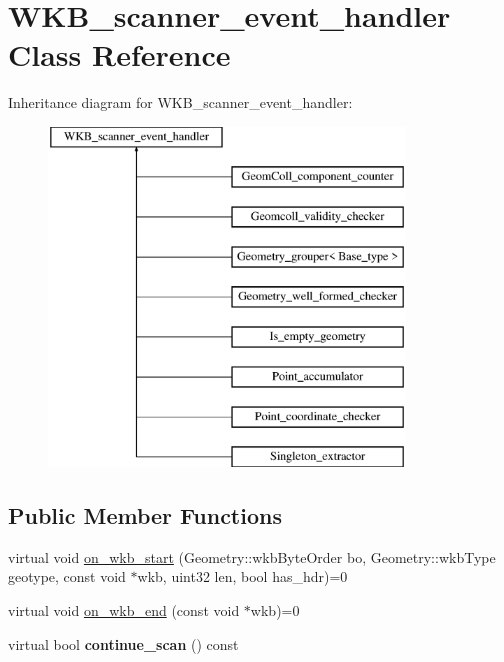 \hypertarget{classWKB__scanner__event__handler}{}\section{W\+K\+B\+\_\+scanner\+\_\+event\+\_\+handler Class Reference}
\label{classWKB__scanner__event__handler}
Inheritance diagram for W\+K\+B\+\_\+scanner\+\_\+event\+\_\+handler\+:\begin{figure}[H]
\begin{center}
\leavevmode
\includegraphics[height=9.000000cm]{classWKB__scanner__event__handler}
\end{center}
\end{figure}
\subsection*{Public Member Functions}
\begin{DoxyCompactItemize}
\item 
virtual void \mbox{\hyperlink{classWKB__scanner__event__handler_a2669ccaafbff44cfc06382dd289f0aaf}{on\+\_\+wkb\+\_\+start}} (Geometry\+::wkb\+Byte\+Order bo, Geometry\+::wkb\+Type geotype, const void $\ast$wkb, uint32 len, bool has\+\_\+hdr)=0
\item 
virtual void \mbox{\hyperlink{classWKB__scanner__event__handler_a07c27cceefdd31f25f1d0b3754786b78}{on\+\_\+wkb\+\_\+end}} (const void $\ast$wkb)=0
\item 
\mbox{\label{classWKB__scanner__event__handler_a9f19aa962a7233580e0b7c3c3e3c7110}} 
virtual bool {\bfseries continue\+\_\+scan} () const
\end{DoxyCompactItemize}



